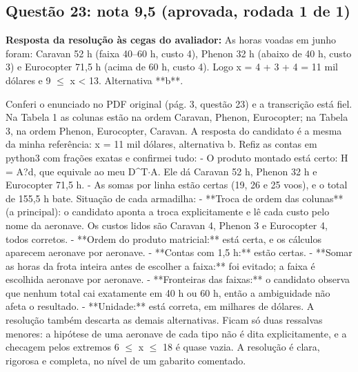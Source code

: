 \documentclass{article}%
\begin{document}
\subsection*{Questão 23: nota 9,5 (aprovada, rodada 1 de 1)}%
\textbf{Resposta da resolução às cegas do avaliador:} As horas voadas em junho foram: Caravan 52 h (faixa 40--60 h, custo 4), Phenon 32 h (abaixo de 40 h, custo 3) e Eurocopter 71,5 h (acima de 60 h, custo 4). Logo x = 4 + 3 + 4 = 11 mil dólares e 9 $\leq$ x < 13. Alternativa **b**.\par %
Conferi o enunciado no PDF original (pág. 3, questão 23) e a transcrição está fiel. Na Tabela 1 as colunas estão na ordem Caravan, Phenon, Eurocopter; na Tabela 3, na ordem Phenon, Eurocopter, Caravan.\newline%
\newline%
A resposta do candidato é a mesma da minha referência: x = 11 mil dólares, alternativa b.\newline%
\newline%
Refiz as contas em python3 com frações exatas e confirmei tudo:\newline%
{-} O produto montado está certo: H = A?d, que equivale ao meu D\^{}T$\cdot$A. Ele dá Caravan 52 h, Phenon 32 h e Eurocopter 71,5 h.\newline%
{-} As somas por linha estão certas (19, 26 e 25 voos), e o total de 155,5 h bate.\newline%
\newline%
Situação de cada armadilha:\newline%
{-} **Troca de ordem das colunas** (a principal): o candidato aponta a troca explicitamente e lê cada custo pelo nome da aeronave. Os custos lidos são Caravan 4, Phenon 3 e Eurocopter 4, todos corretos.\newline%
{-} **Ordem do produto matricial:** está certa, e os cálculos aparecem aeronave por aeronave.\newline%
{-} **Contas com 1,5 h:** estão certas.\newline%
{-} **Somar as horas da frota inteira antes de escolher a faixa:** foi evitado; a faixa é escolhida aeronave por aeronave.\newline%
{-} **Fronteiras das faixas:** o candidato observa que nenhum total cai exatamente em 40 h ou 60 h, então a ambiguidade não afeta o resultado.\newline%
{-} **Unidade:** está correta, em milhares de dólares.\newline%
\newline%
A resolução também descarta as demais alternativas. Ficam só duas ressalvas menores: a hipótese de uma aeronave de cada tipo não é dita explicitamente, e a checagem pelos extremos 6 $\leq$ x $\leq$ 18 é quase vazia. A resolução é clara, rigorosa e completa, no nível de um gabarito comentado.%
\end{document}
